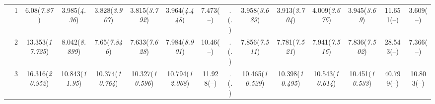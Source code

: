\documentclass{article}
\begin{document}
\begin{table}[tbp]
{\begin{tabularx}{\textwidth}{lCCCCCCCCCCCCCC}
&1&6.08\newline (\emph{7.87})&3.985\newline (\emph{4.36})&3.828\newline (\emph{3.907})&3.815\newline (\emph{3.792})&3.964\newline (\emph{4.448})&7.473\newline (--)&.\newline (\emph{.})&3.958\newline (\emph{3.689})&3.913\newline (\emph{3.704})&4.009\newline (\emph{3.676})&3.945\newline (\emph{3.69})&11.651\newline (--)&3.609\newline (--) \tabularnewline
&2&13.353\newline (\emph{17.725})&8.042\newline (\emph{8.899})&7.65\newline (\emph{7.846})&7.633\newline (\emph{7.628})&7.984\newline (\emph{8.901})&10.46\newline (--)&.\newline (\emph{.})&7.856\newline (\emph{7.511})&7.781\newline (\emph{7.521})&7.941\newline (\emph{7.516})&7.836\newline (\emph{7.502})&28.543\newline (--)&7.366\newline (--) \tabularnewline
&3&16.316\newline (\emph{20.952})&10.843\newline (\emph{11.95})&10.374\newline (\emph{10.764})&10.327\newline (\emph{10.596})&10.794\newline (\emph{12.068})&11.928\newline (--)&.\newline (\emph{.})&10.465\newline (\emph{10.529})&10.398\newline (\emph{10.495})&10.543\newline (\emph{10.614})&10.451\newline (\emph{10.533})&40.799\newline (--)&10.803\newline (--) \tabularnewline

\end{tabularx}}
\end{table}
\end{document}
